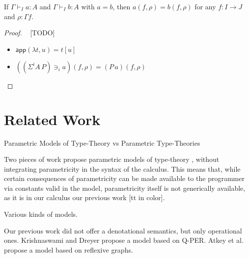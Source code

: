 \documentclass[english]{PaperTools/latex/lipics}
\newcommand\op[1]{∋_{#1}}
\newcommand\ip[3]{Σ^{#1} {#2}\,{#3}}
\def\app#1#2{\mathsf{app}(#1,#2)}
\begin{document}
\begin{theorem}
  If $Γ ⊢_I a : A$ and $Γ ⊢_I b : A$ with $a = b$, then
  $a(f,ρ) = b(f,ρ)$ for any $f : I → J$ and $ρ : Γf$.
\end{theorem}
\begin{proof}~
  [TODO]
  \begin{itemize}
    \item $\app{λt}{u} = t[u]$
    \item $({(\ip i A P)} \op i a)(f,ρ) = (P\,a)(f,ρ)$
  \end{itemize}
\end{proof}


\section{Related Work}


Parametric Models of Type-Theory vs Parametric Type-Theories

Two pieces of work propose parametric models of type-theory \citep{atkey_relationally_2014,krishnaswami_internalizing_2013}, without
integrating parametricity in the syntax of the calculus. This means
that, while certain consequences of parametricity can be made
available to the programmer via constants valid in the model,
parametricity itself is not generically available, as it is in our
calculus our previous work [tt in color].


Various kinds of models.

Our previous work did not offer a denotational semantics, but only
operational ones.  Krishnaswami and Dreyer propose a model based on
Q-PER.  Atkey et al. propose a model based on reflexive graphs.



\end{document}
